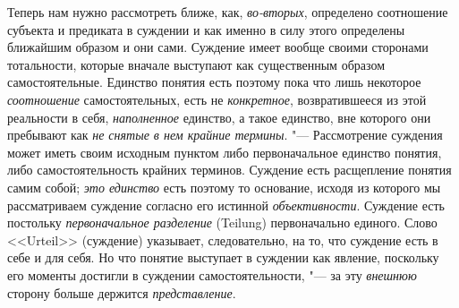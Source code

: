{Теперь нам нужно рассмотреть ближе, как,
{\em во-вторых},
определено соотношение субъекта и предиката в суждении и как
именно в силу этого определены ближайшим образом и они сами. Суждение имеет
вообще своими сторонами тотальности, которые вначале выступают как
существенным образом самостоятельные. Единство понятия есть поэтому пока
что лишь некоторое {\em соотношение}
самостоятельных, есть не
{\em конкретное},
возвратившееся из этой реальности в себя,
{\em наполненное}
единство, а такое единство, вне которого они пребывают
как {\em не снятые в нем
крайние термины}. "--- Рассмотрение суждения может иметь своим
исходным пунктом либо первоначальное единство понятия, либо
самостоятельность крайних терминов. Суждение есть расщепление понятия самим
собой; {\em это единство}
есть поэтому то основание, исходя из которого мы
рассматриваем суждение согласно его истинной
{\em объективности}.
Суждение есть постольку
{\em первоначальное разделение}
(Teilung) первоначально единого. Слово <<Urteil>> (суждение)
указывает, следовательно, на то, что суждение есть в себе и для себя. Но
что понятие выступает в суждении как явление, поскольку его моменты
достигли в суждении самостоятельности, "--- за эту
{\em внешнюю} сторону
больше держится {\em представление}.

}
